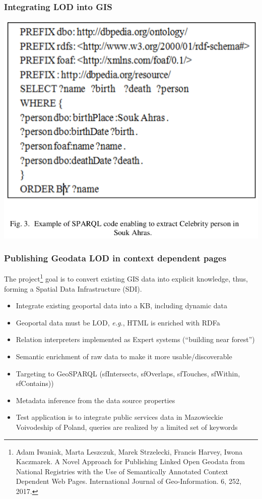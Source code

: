 \documentclass[10pt]{beamer}
\begin{document}
\begin{frame}
  \frametitle{Integrating LOD into GIS}
  \centering
  \includegraphics[width=0.8\linewidth]{integrating-lod-gis-query.png}
\end{frame}

\begin{frame}
  \frametitle{Publishing Geodata LOD in context dependent pages}
  The project\footnote{Adam Iwaniak, Marta Leszczuk, Marek Strzelecki, Francis Harvey, Iwona Kaczmarek. A Novel Approach for Publishing Linked Open Geodata from National Registries with the Use of Semantically Annotated Context Dependent Web Pages. International Journal of Geo-Information. 6, 252, 2017. } goal is to convert existing GIS data into explicit knowledge, thus, forming a Spatial Data Infrastructure (SDI).
  \begin{itemize}
  \item Integrate existing geoportal data into a KB, including dynamic data
  \item Geoportal data must be LOD, \emph{e.g.}, HTML is enriched with RDFa
  \item Relation interpreters implemented as Expert systems (``building near forest'')
  \item Semantic enrichment of raw data to make it more usable/discoverable
  \item Targeting to GeoSPARQL (sfIntersects, sfOverlaps, sfTouches, sfWithin, sfContains))
  \item Metadata inference from the data source properties
  \item Test application is to integrate public services data in Mazowieckie Voivodeship of Poland, queries are realized by a limited set of keywords
  \end{itemize}
\end{frame}
\end{document}
